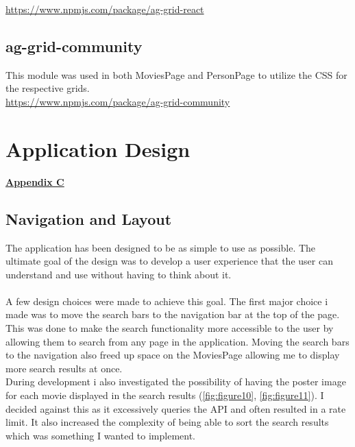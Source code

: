 \documentclass[12pt,a4paper]{article}
\begin{document}
			\href{https://www.npmjs.com/package/ag-grid-react}{https://www.npmjs.com/package/ag-grid-react}
		
		\subsection{ag-grid-community}
			This module was used in both MoviesPage and PersonPage to utilize the CSS for the respective grids.\\

			\href{https://www.npmjs.com/package/ag-grid-community}{https://www.npmjs.com/package/ag-grid-community}
	
	\newpage

	\section{Application Design}
		\hyperref[subsec:appendixC]{\textbf{Appendix C}}
		\subsection{Navigation and Layout}
			The application has been designed to be as simple to use as possible. The ultimate goal of the 
			design was to develop a user experience that the user can understand and use without having to 
			think about it.\\
			\\
			A few design choices were made to achieve this goal. The first major choice i made was to move the 
			search bars to the navigation bar at the top of the page. This was done to make the search 
			functionality more accessible to the user by allowing them to search from any page in the 
			application. Moving the search bars to the navigation also freed up space on the MoviesPage 
			allowing me to display more search results at once.\\

			During development i also investigated the possibility of having the poster image for each movie 
			displayed in the search results (\cref{fig:figure10}, \cref{fig:figure11}). I decided against this 
			as it excessively queries the API and often resulted in a rate limit. It also increased the complexity 
			of being able to sort the search results which was something I wanted to implement.\\
\end{document}
